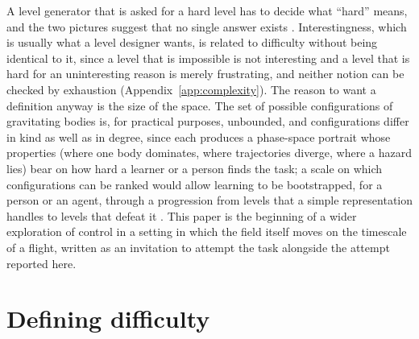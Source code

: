 \documentclass[11pt]{article}
\begin{document}
A level generator that is asked for a hard level has to decide what
``hard'' means, and the two pictures suggest that no single answer exists
\cite{furuta2021,dennis2020,rutherford2024}. Interestingness, which is
usually what a level designer wants, is related to difficulty without being
identical to it, since a level that is impossible is not interesting and a
level that is hard for an uninteresting reason is merely frustrating, and
neither notion can be checked by exhaustion (Appendix~\ref{app:complexity}).
The reason to want a definition anyway is the size of the space. The set of
possible configurations of gravitating bodies is, for practical purposes,
unbounded, and configurations differ in kind as well as in degree, since
each produces a phase-space portrait whose properties (where one body
dominates, where trajectories diverge, where a hazard lies) bear on how hard
a learner or a person finds the task; a scale on which configurations can
be ranked would allow learning to be bootstrapped, for a person or an agent,
through a progression from levels that a simple representation handles to
levels that defeat it \cite{bengio2009,narvekar2020}. This paper is the
beginning of a wider exploration of control in a setting in which the field
itself moves on the timescale of a flight, written as an invitation to
attempt the task alongside the attempt reported here.
\section{Defining difficulty}
\label{sec:hard}
\end{document}
